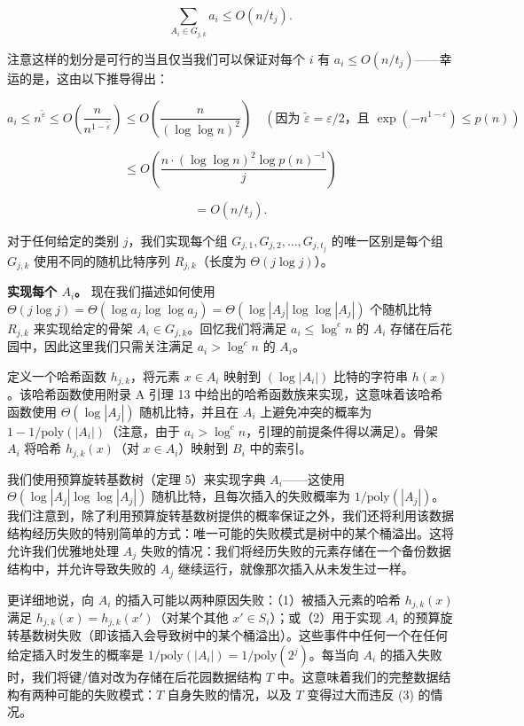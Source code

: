 \documentclass[12pt,a4paper]{ctexart}
\theoremstyle{remark}
\begin{document}
$$\sum_{A_i\in G_{j,k}} a_i\leq O(n/t_j).$$

注意这样的划分是可行的当且仅当我们可以保证对每个 $i$ 有 $a_i\leq O(n/t_j)$——幸运的是，这由以下推导得出：

$$a_i\leq n^{\tilde{\varepsilon}}\leq O\left(\frac{n}{n^{1-\tilde{\varepsilon}}}\right)\leq O\left(\frac{n}{(\log\log n)^2}\right)\quad(\text{因为 }\tilde{\varepsilon}=\varepsilon/2\text{，且 }\exp(-n^{1-\varepsilon})\leq p(n))$$

$$\leq O\left(\frac{n\cdot(\log\log n)^2\log p(n)^{-1}}{j}\right)$$

$$=O(n/t_j).$$

对于任何给定的类别 $j$，我们实现每个组 $G_{j,1},G_{j,2},\ldots,G_{j,t_j}$ 的唯一区别是每个组 $G_{j,k}$ 使用不同的随机比特序列 $R_{j,k}$（长度为 $\Theta(j\log j)$）。

\textbf{实现每个 $A_i$。} 现在我们描述如何使用 $\Theta(j\log j)=\Theta(\log a_j\log\log a_j)=\Theta(\log|A_j|\log\log|A_j|)$ 个随机比特 $R_{j,k}$ 来实现给定的骨架 $A_i\in G_{j,k}$。回忆我们将满足 $a_i\leq\log^c n$ 的 $A_i$ 存储在后花园中，因此这里我们只需关注满足 $a_i>\log^c n$ 的 $A_i$。

定义一个哈希函数 $h_{j,k}$，将元素 $x\in A_i$ 映射到 $(\log|A_i|)$ 比特的字符串 $h(x)$。该哈希函数使用附录 A 引理 13 中给出的哈希函数族来实现，这意味着该哈希函数使用 $\Theta(\log|A_j|)$ 随机比特，并且在 $A_i$ 上避免冲突的概率为 $1-1/\text{poly}(|A_i|)$（注意，由于 $a_i>\log^c n$，引理的前提条件得以满足）。骨架 $A_i$ 将哈希 $h_{j,k}(x)$（对 $x\in A_i$）映射到 $B_i$ 中的索引。

我们使用预算旋转基数树（定理 5）来实现字典 $A_i$——这使用 $\Theta(\log|A_j|\log\log|A_j|)$ 随机比特，且每次插入的失败概率为 $1/\text{poly}(|A_j|)$。我们注意到，除了利用预算旋转基数树提供的概率保证之外，我们还将利用该数据结构经历失败的特别简单的方式：唯一可能的失败模式是树中的某个桶溢出。这将允许我们优雅地处理 $A_j$ 失败的情况：我们将经历失败的元素存储在一个备份数据结构中，并允许导致失败的 $A_j$ 继续运行，就像那次插入从未发生过一样。

更详细地说，向 $A_i$ 的插入可能以两种原因失败：（1）被插入元素的哈希 $h_{j,k}(x)$ 满足 $h_{j,k}(x)=h_{j,k}(x')$（对某个其他 $x'\in S_i$）；或（2）用于实现 $A_i$ 的预算旋转基数树失败（即该插入会导致树中的某个桶溢出）。这些事件中任何一个在任何给定插入时发生的概率是 $1/\text{poly}(|A_i|)=1/\text{poly}(2^j)$。每当向 $A_i$ 的插入失败时，我们将键/值对改为存储在后花园数据结构 $T$ 中。这意味着我们的完整数据结构有两种可能的失败模式：$T$ 自身失败的情况，以及 $T$ 变得过大而违反 (3) 的情况。
\end{document}
